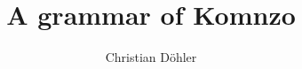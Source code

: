 \author{Christian Döhler}
\title{A grammar of Komnzo}
\subtitle{}
\renewcommand{\lsSeries}{sidl}
\renewcommand{\lsSeriesNumber}{}
